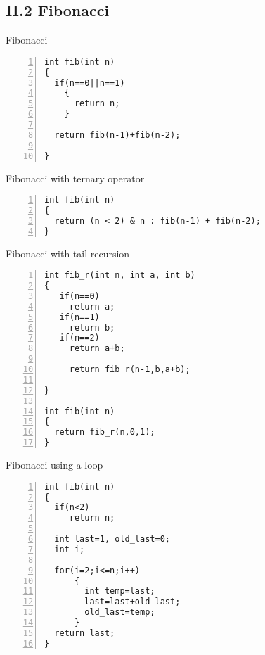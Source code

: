 \documentclass{beamer}
\begin{document}
\subsection*{II.2 Fibonacci}
\begin{frame}[fragile]{Fibonacci}
\begin{lstlisting}[numbers=left]
int fib(int n)
{
  if(n==0||n==1)
    {
      return n;
    }

  return fib(n-1)+fib(n-2);

}
\end{lstlisting}
\end{frame}

\begin{frame}[fragile]{Fibonacci with ternary operator}
\begin{lstlisting}[numbers=left]
int fib(int n)
{
  return (n < 2) & n : fib(n-1) + fib(n-2); 
}
\end{lstlisting}
\end{frame}



\begin{frame}[fragile]{Fibonacci with tail recursion}
\begin{lstlisting}[numbers=left]
int fib_r(int n, int a, int b)
{
   if(n==0)
     return a;
   if(n==1)
     return b;
   if(n==2)
     return a+b;
     
     return fib_r(n-1,b,a+b);

}

int fib(int n)
{
  return fib_r(n,0,1);
}
\end{lstlisting}
\end{frame}



\begin{frame}[fragile]{Fibonacci using a loop}
\begin{lstlisting}[numbers=left]
int fib(int n)
{
  if(n<2)
     return n;
  
  int last=1, old_last=0;
  int i;

  for(i=2;i<=n;i++)
      {
        int temp=last;
        last=last+old_last;
        old_last=temp;
      }
  return last;
}
\end{lstlisting}
\end{frame}
\end{document}
